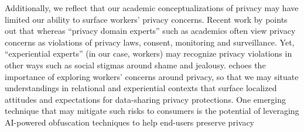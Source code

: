 {Additionally, we reflect that our academic conceptualizations of privacy may have limited our ability to surface workers' privacy concerns. Recent work by \citet{kahn2024expanding} points out that whereas ``privacy domain experts'' such as academics often view privacy concerns as violations of privacy laws, consent, monitoring and surveillance. Yet, ``experiential experts'' (in our case, workers) may recognize privacy violations in other ways such as social stigmas around shame and jealousy.  \citet{vashistha2018examining} echoes the importance of exploring workers' concerns around privacy, so that we may situate understandings in relational and experiential contexts that surface localized attitudes and expectations for data-sharing privacy protections. One emerging technique that may mitigate such risks to consumers is the potential of leveraging AI-powered obfuscation techniques to help end-users preserve privacy \cite{monteiro2024manipulate}}